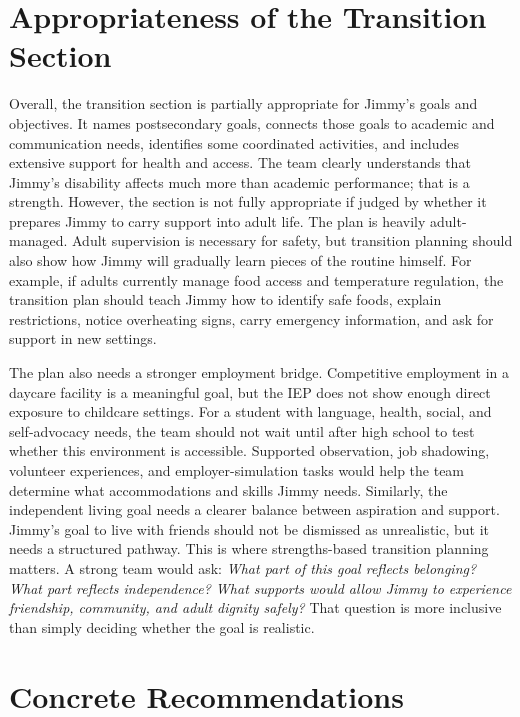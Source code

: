 \documentclass[11pt]{article}
\begin{document}
\section{Appropriateness of the Transition Section}

Overall, the transition section is partially appropriate for Jimmy's goals and objectives. It names postsecondary goals, connects those goals to academic and communication needs, identifies some coordinated activities, and includes extensive support for health and access. The team clearly understands that Jimmy's disability affects much more than academic performance; that is a strength. However, the section is not fully appropriate if judged by whether it prepares Jimmy to carry support into adult life. The plan is heavily adult-managed. Adult supervision is necessary for safety, but transition planning should also show how Jimmy will gradually learn pieces of the routine himself. For example, if adults currently manage food access and temperature regulation, the transition plan should teach Jimmy how to identify safe foods, explain restrictions, notice overheating signs, carry emergency information, and ask for support in new settings.

\newpage
The plan also needs a stronger employment bridge. Competitive employment in a daycare facility is a meaningful goal, but the IEP does not show enough direct exposure to childcare settings. For a student with language, health, social, and self-advocacy needs, the team should not wait until after high school to test whether this environment is accessible. Supported observation, job shadowing, volunteer experiences, and employer-simulation tasks would help the team determine what accommodations and skills Jimmy needs. Similarly, the independent living goal needs a clearer balance between aspiration and support. Jimmy's goal to live with friends should not be dismissed as unrealistic, but it needs a structured pathway. This is where strengths-based transition planning matters. A strong team would ask: \textit{What part of this goal reflects belonging? What part reflects independence? What supports would allow Jimmy to experience friendship, community, and adult dignity safely?} That question is more inclusive than simply deciding whether the goal is realistic.

\section{Concrete Recommendations}
\end{document}
